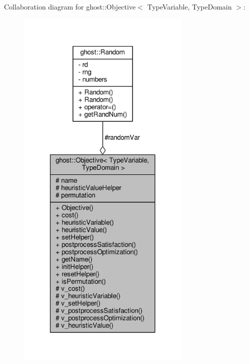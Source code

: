 Collaboration diagram for ghost\-:\-:Objective$<$ Type\-Variable, Type\-Domain $>$\-:
\nopagebreak
\begin{figure}[H]
\begin{center}
\leavevmode
\includegraphics[width=236pt]{classghost_1_1Objective__coll__graph}
\end{center}
\end{figure}
